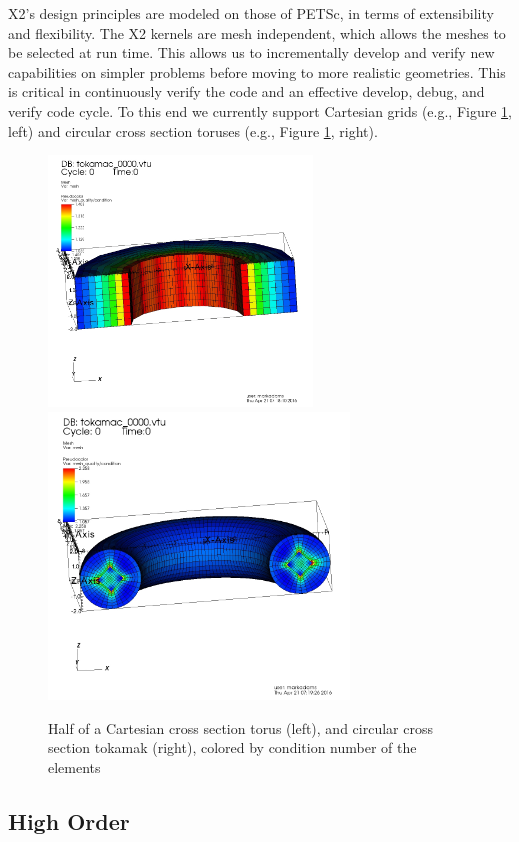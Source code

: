 \documentclass[review]{siamart}
\begin{document}
X2's design principles are modeled on those of PETSc, in terms of extensibility and flexibility.
The X2 kernels are mesh independent, which allows the meshes to be selected at run time.
This allows us to incrementally develop and verify new capabilities on simpler problems before moving to more realistic geometries.
This is critical in continuously verify the code and an effective develop, debug, and verify code cycle.
To this end we currently support Cartesian grids  (e.g., Figure \ref{fig:grids}, left) and circular cross section toruses (e.g., Figure \ref{fig:grids}, right).
\begin{figure}[h!]
   \centering
   \includegraphics[width=70mm]{half_box_torus.jpeg} 
    \includegraphics[width=80mm]{half_torus.jpeg} 
   \caption{Half of a Cartesian cross section torus (left), and circular cross section tokamak (right), colored by condition number of the elements}
   \label{fig:grids}
\end{figure}

\subsection{High Order}
\label{sec:ho}
\end{document}
